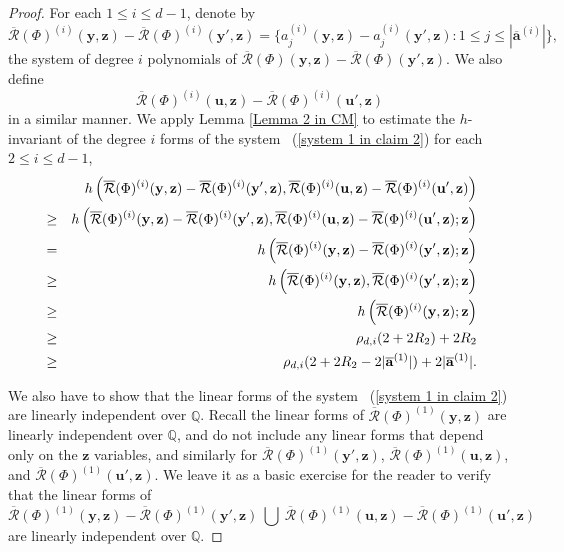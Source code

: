 \documentclass[12pt]{amsart}
\theoremstyle{definition}
\theoremstyle{remark}
\numberwithin{equation}{section}
\begin{document}
\begin{proof}
For each $1 \leq i \leq d-1$, denote by
$$
\overline{\mathcal{R}}(\Phi)^{(i)} (\mathbf{y}, \mathbf{z}) - \overline{\mathcal{R}}(\Phi)^{(i)} (\mathbf{y}', \mathbf{z})
=
\{ {a}_j^{(i)}(\mathbf{y}, \mathbf{z}) - {a}_j^{(i)}(\mathbf{y}', \mathbf{z}) : 1 \leq j \leq |\overline{\mathbf{a}}^{(i)}| \},
$$
the system of degree $i$ polynomials of $\overline{\mathcal{R}}(\Phi) (\mathbf{y}, \mathbf{z}) - \overline{\mathcal{R}}(\Phi) (\mathbf{y}', \mathbf{z})$.
We also define
$$
\overline{\mathcal{R}}(\Phi)^{(i)} (\mathbf{u}, \mathbf{z}) - \overline{\mathcal{R}}(\Phi)^{(i)} (\mathbf{u}', \mathbf{z})
$$
in a similar manner. We apply Lemma \ref{Lemma 2 in CM} to estimate the $h$-invariant of the degree $i$ forms of the system ~(\ref{system 1 in claim 2}) for each $2 \leq i \leq d-1$,
\begin{eqnarray}
&&
h \left( \overline{\mathcal{R}}(\Phi)^{(i)} (\mathbf{y}, \mathbf{z}) - \overline{\mathcal{R}}(\Phi)^{(i)} (\mathbf{y}', \mathbf{z}),  \overline{\mathcal{R}}(\Phi)^{(i)} (\mathbf{u}, \mathbf{z}) - \overline{\mathcal{R}}(\Phi)^{(i)} (\mathbf{u}', \mathbf{z} ) \right)
\notag
\\
&\geq &h \left( \overline{\mathcal{R}}(\Phi)^{(i)} (\mathbf{y}, \mathbf{z}) - \overline{\mathcal{R}}(\Phi)^{(i)} (\mathbf{y}', \mathbf{z}),  \overline{\mathcal{R}}(\Phi)^{(i)} (\mathbf{u}, \mathbf{z}) - \overline{\mathcal{R}}(\Phi)^{(i)} (\mathbf{u}', \mathbf{z} ) ; \mathbf{z} \right)
\notag
\\
&=&
h \left( \overline{\mathcal{R}}(\Phi)^{(i)} (\mathbf{y}, \mathbf{z}) - \overline{\mathcal{R}}(\Phi)^{(i)} (\mathbf{y}', \mathbf{z}) ; \mathbf{z}  \right)
\notag
\\
&\geq&
h \left( \overline{\mathcal{R}}(\Phi)^{(i)} (\mathbf{y}, \mathbf{z}) , \overline{\mathcal{R}}(\Phi)^{(i)} (\mathbf{y}', \mathbf{z}) ; \mathbf{z}  \right)
\notag
\\
&\geq&
h \left( \overline{\mathcal{R}}(\Phi)^{(i)} (\mathbf{y}, \mathbf{z}) ; \mathbf{z}  \right)
\notag
\\
&\geq&
\rho_{d,i}( 2 + 2 R_2 ) + 2 R_2
\notag
\\
&\geq&
\rho_{d,i}( 2 + 2 R_2 - 2| \overline{{ \mathbf{a} }}^{(1)}| ) + 2 | \overline{{ \mathbf{a} }}^{(1)}|.
\notag
\end{eqnarray}

We also have to show that the linear forms of the system ~(\ref{system 1 in claim 2}) are linearly independent over $\mathbb{Q}$.
Recall the linear forms of $\overline{\mathcal{R}}(\Phi)^{(1)} (\mathbf{y}, \mathbf{z})$ are linearly independent over $\mathbb{Q}$,
and do not include any linear forms that depend only on the $\mathbf{z}$ variables, and similarly for $\overline{\mathcal{R}}(\Phi)^{(1)} (\mathbf{y}', \mathbf{z})$, $\overline{\mathcal{R}}(\Phi)^{(1)} (\mathbf{u}, \mathbf{z})$, and $\overline{\mathcal{R}}(\Phi)^{(1)} (\mathbf{u}', \mathbf{z})$.
We leave it as a basic exercise for the reader to verify that the linear forms of
$$
\overline{\mathcal{R}}(\Phi)^{(1)} (\mathbf{y}, \mathbf{z}) - \overline{\mathcal{R}}(\Phi)^{(1)} (\mathbf{y}', \mathbf{z}) \
\bigcup
\ \overline{\mathcal{R}}(\Phi)^{(1)} (\mathbf{u}, \mathbf{z}) - \overline{\mathcal{R}}(\Phi)^{(1)} (\mathbf{u}', \mathbf{z})
$$
are linearly independent over $\mathbb{Q}$.


\end{proof}
\end{document}
